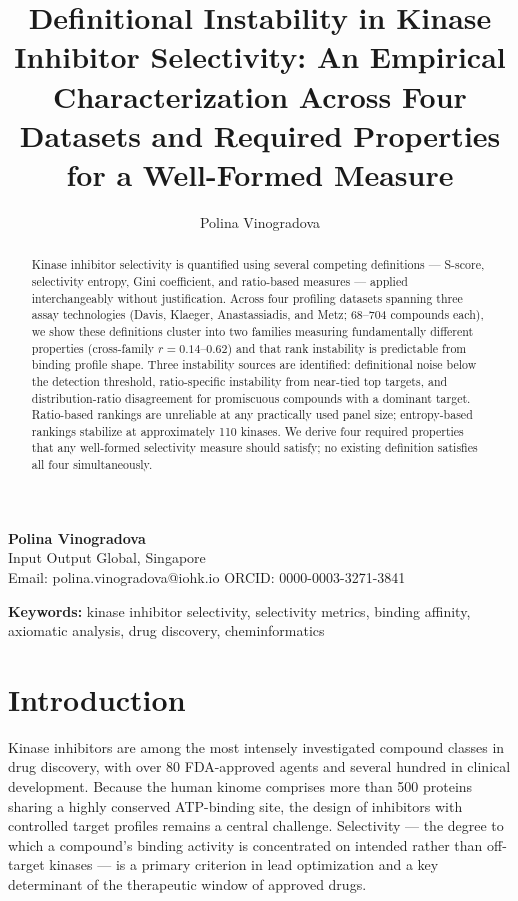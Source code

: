 \documentclass[journal=jcisd8,manuscript=article]{achemso}
\author{Polina Vinogradova}
\affiliation{Input Output Global, Singapore}
\title{Definitional Instability in Kinase Inhibitor Selectivity:
  An Empirical Characterization Across Four Datasets and Required Properties
  for a Well-Formed Measure}
\begin{document}
\noindent\textbf{Polina Vinogradova}\\
Input Output Global, Singapore\\
Email: polina.vinogradova@iohk.io \quad ORCID: 0000-0003-3271-3841

\bigskip
\noindent\textbf{Keywords:} kinase inhibitor selectivity, selectivity metrics,
binding affinity, axiomatic analysis, drug discovery, cheminformatics

\bigskip


\begin{abstract}
Kinase inhibitor selectivity is quantified using several competing definitions
--- S-score, selectivity entropy, Gini coefficient, and ratio-based measures ---
applied interchangeably without justification.
Across four profiling datasets spanning three assay technologies (Davis,
Klaeger, Anastassiadis, and Metz; 68--704 compounds each), we show these
definitions cluster into two families measuring fundamentally different
properties (cross-family $r = 0.14$--$0.62$) and that rank instability is
predictable from binding profile shape.
Three instability sources are identified: definitional noise below the detection
threshold, ratio-specific instability from near-tied top targets, and
distribution-ratio disagreement for promiscuous compounds with a dominant target.
Ratio-based rankings are unreliable at any practically used panel size;
entropy-based rankings stabilize at approximately 110 kinases.
We derive four required properties that any well-formed selectivity measure
should satisfy; no existing definition satisfies all four simultaneously.
\end{abstract}

\section{Introduction}
\label{sec:intro}

Kinase inhibitors are among the most intensely investigated compound classes
in drug discovery, with over 80 FDA-approved agents and several hundred in
clinical development.\cite{Roskoski2024}
Because the human kinome comprises more than 500 proteins sharing a
highly conserved ATP-binding site,\cite{Manning2002} the design of inhibitors
with controlled target profiles remains a central challenge.
Selectivity --- the degree to which a compound's binding activity is
concentrated on intended rather than off-target kinases --- is a primary
criterion in lead optimization and a key determinant of the therapeutic window
of approved drugs.\cite{Bhullar2018}
\end{document}
